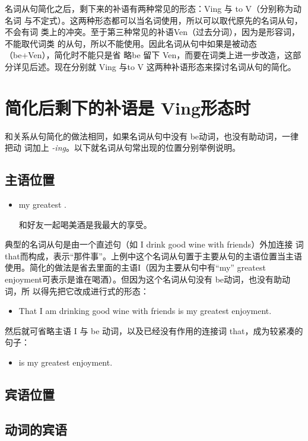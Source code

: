名词从句简化之后，剩下来的补语有两种常见的形态：Ving 与 to V（分别称为动名词
与不定式）。这两种形态都可以当名词使用，所以可以取代原先的名词从句，不会有词
类上的冲突。至于第三种常见的补语Ven（过去分词），因为是形容词，不能取代词类
的从句，所以不能使用。因此名词从句中如果是被动态（be+Ven），简化时不能只是省
略be 留下 Ven，而要在词类上进一步改造，这部分详见后述。现在分别就 Ving 与to
V 这两种补语形态来探讨名词从句的简化。

\section{简化后剩下的补语是 Ving形态时}

和关系从句简化的做法相同，如果名词从句中没有 be动词，也没有助动词，一律把动
词加上 \emph{-ing}。以下就名词从句常出现的位置分别举例说明。

\subsection{主语位置}

\begin{itemize}
\item {}  my greatest .

  和好友一起喝美酒是我最大的享受。
\end{itemize}
典型的名词从句是由一个直述句（如 I drink good wine with friends）外加连接
词 that而构成，表示“那件事”。上例中这个名词从句置于主要从句的主语位置当主语
使用。简化的做法是省去里面的主语I（因为主要从句中有“my” greatest
enjoyment可表示是谁在喝酒）。但因为这个名词从句没有 be动词，也没有助动词，所
以得先把它改成进行式的形态：
\begin{itemize}
\item That I am drinking good wine with friends is my greatest enjoyment.
\end{itemize}
然后就可省略主语 I 与 be 动词，以及已经没有作用的连接词
that，成为较紧凑的句子：
\begin{itemize}
\item {} is my greatest enjoyment.
\end{itemize}

\subsection{宾语位置}

\subsection{动词的宾语}

